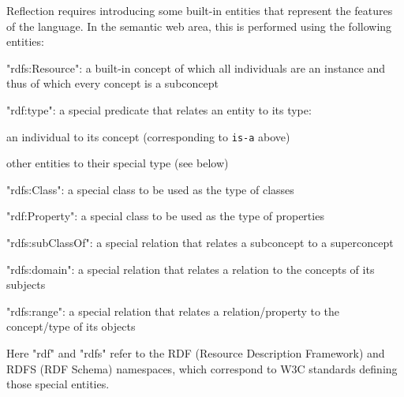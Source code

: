 Reflection requires introducing some built-in entities that represent the features of the language.
In the semantic web area, this is performed using the following entities:
\begin{compactitem}
 \item "rdfs:Resource": a built-in concept of which all individuals are an instance and thus of which every concept is a subconcept
 \item "rdf:type": a special predicate that relates an entity to its type:
  \begin{compactitem}
   \item an individual to its concept (corresponding to \texttt{is-a} above)
   \item other entities to their special type (see below)
  \end{compactitem}
 \item "rdfs:Class": a special class to be used as the type of classes
 \item "rdf:Property": a special class to be used as the type of properties
 \item "rdfs:subClassOf": a special relation that relates a subconcept to a superconcept
 \item "rdfs:domain": a special relation that relates a relation to the concepts of its subjects
 \item "rdfs:range": a special relation that relates a relation/property to the concept/type of its objects
\end{compactitem}
Here "rdf" and "rdfs" refer to the RDF (Resource Description Framework) and RDFS (RDF Schema) namespaces, which correspond to W3C standards defining those special entities.

